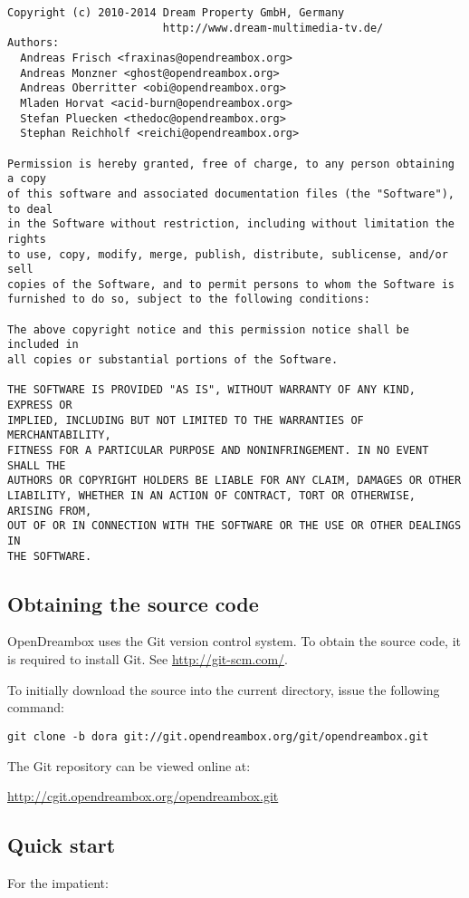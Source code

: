 \documentclass[a4paper]{article}
\newcommand{\shell}[1]{\texttt{\small #1}}
\begin{document}
    \begin{verbatim}
Copyright (c) 2010-2014 Dream Property GmbH, Germany
                        http://www.dream-multimedia-tv.de/
Authors:
  Andreas Frisch <fraxinas@opendreambox.org>
  Andreas Monzner <ghost@opendreambox.org>
  Andreas Oberritter <obi@opendreambox.org>
  Mladen Horvat <acid-burn@opendreambox.org>
  Stefan Pluecken <thedoc@opendreambox.org>
  Stephan Reichholf <reichi@opendreambox.org>

Permission is hereby granted, free of charge, to any person obtaining a copy
of this software and associated documentation files (the "Software"), to deal
in the Software without restriction, including without limitation the rights
to use, copy, modify, merge, publish, distribute, sublicense, and/or sell
copies of the Software, and to permit persons to whom the Software is
furnished to do so, subject to the following conditions:

The above copyright notice and this permission notice shall be included in
all copies or substantial portions of the Software.

THE SOFTWARE IS PROVIDED "AS IS", WITHOUT WARRANTY OF ANY KIND, EXPRESS OR
IMPLIED, INCLUDING BUT NOT LIMITED TO THE WARRANTIES OF MERCHANTABILITY,
FITNESS FOR A PARTICULAR PURPOSE AND NONINFRINGEMENT. IN NO EVENT SHALL THE
AUTHORS OR COPYRIGHT HOLDERS BE LIABLE FOR ANY CLAIM, DAMAGES OR OTHER
LIABILITY, WHETHER IN AN ACTION OF CONTRACT, TORT OR OTHERWISE, ARISING FROM,
OUT OF OR IN CONNECTION WITH THE SOFTWARE OR THE USE OR OTHER DEALINGS IN
THE SOFTWARE.
    \end{verbatim}

  \subsection{Obtaining the source code}
    OpenDreambox uses the Git version control system. To obtain the source
    code, it is required to install Git. See \url{http://git-scm.com/}.

    To initially download the source into the current directory, issue the
    following command:

    \shell{git clone -b dora git://git.opendreambox.org/git/opendreambox.git}

    The Git repository can be viewed online at:

    \url{http://cgit.opendreambox.org/opendreambox.git}

  \subsection{Quick start}
    For the impatient:
\end{document}
